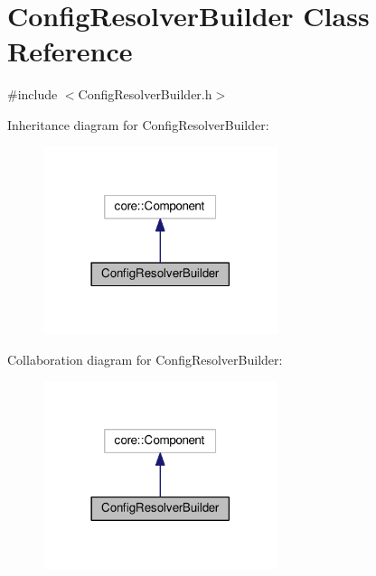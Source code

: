 \hypertarget{classConfigResolverBuilder}{}\section{Config\+Resolver\+Builder Class Reference}
\label{classConfigResolverBuilder}


{\ttfamily \#include $<$Config\+Resolver\+Builder.\+h$>$}



Inheritance diagram for Config\+Resolver\+Builder\+:\nopagebreak
\begin{figure}[H]
\begin{center}
\leavevmode
\includegraphics[width=194pt]{classConfigResolverBuilder__inherit__graph}
\end{center}
\end{figure}


Collaboration diagram for Config\+Resolver\+Builder\+:\nopagebreak
\begin{figure}[H]
\begin{center}
\leavevmode
\includegraphics[width=194pt]{classConfigResolverBuilder__coll__graph}
\end{center}
\end{figure}
